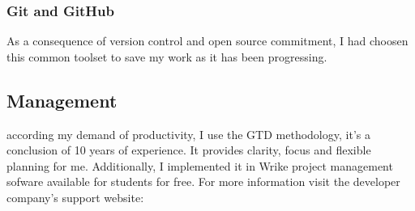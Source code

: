 			\subsubsection{Git and GitHub}
As a consequence of version control and open source commitment, I had choosen this common toolset to save my work as it has been progressing.
\cite{Github}
		\subsection{Management}
according my demand of productivity, I use the GTD\cite{GTD} methodology, it's a conclusion of 10 years of experience. It provides clarity, focus and flexible planning for me. Additionally, I implemented it in Wrike \cite{WRIKE} project management sofware available for students for free. For more information visit the developer company's support website: \cite{WRIKE_for_students}